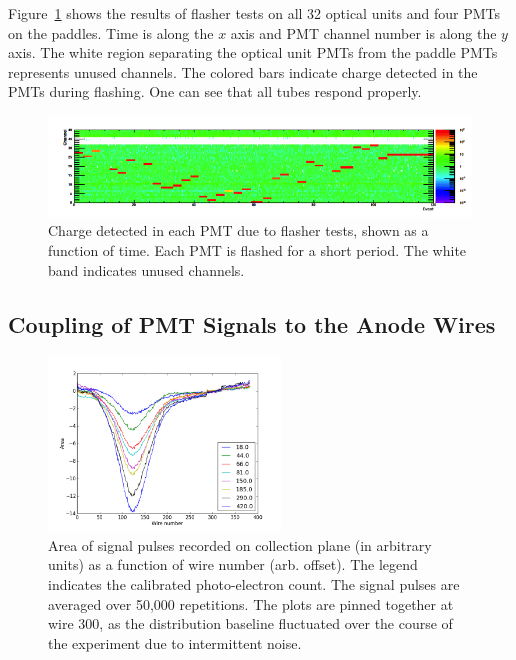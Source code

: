 Figure~\ref{fig:flasherresult} shows the results of flasher tests on all 32 optical units and four PMTs on the paddles.  Time is along the $x$ axis and PMT channel number is along the $y$ axis.  The white region separating the optical unit PMTs from the paddle PMTs represents unused channels.  The colored bars indicate charge detected in the PMTs during flashing.  One can see that all tubes respond properly.


\begin{figure}[t]
\centering 
\includegraphics[width=\textwidth]{./light_figures/flasherresult.png}
\caption{Charge detected in each PMT due to flasher tests, shown as a function of time.  Each PMT is flashed for a short period. The white band indicates unused channels. \label{fig:flasherresult}  }
\end{figure}



\subsection{Coupling of PMT Signals to the Anode Wires}

\begin{figure}[t]
\centering 
\includegraphics[width=0.55\textwidth]{./light_figures/PMT_xtalk_PE_plot.png}
\caption{Area of signal pulses recorded on collection plane (in arbitrary units) as a function of wire number (arb. offset). The legend indicates the calibrated photo-electron count. The signal pulses are averaged over 50,000 repetitions. The plots are pinned together at wire 300, as the distribution baseline fluctuated over the course of the experiment due to intermittent noise.
 \label{fig:PMTxtalk}  }
\end{figure}

